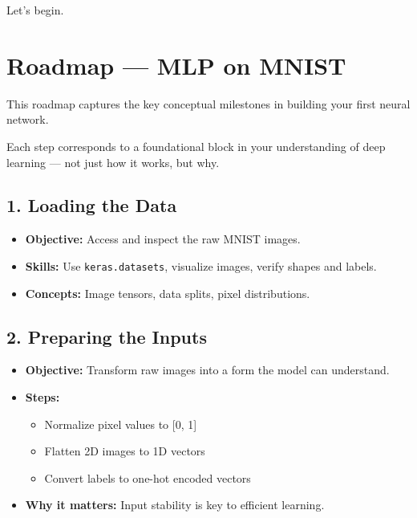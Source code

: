 \documentclass[11pt]{article}
\begin{document}
Let’s begin.

\section*{Roadmap — MLP on MNIST}

\begin{tcolorbox}[colback=blue!5!white, colframe=blue!40!black, title= The Journey Ahead]
This roadmap captures the key conceptual milestones in building your first neural network.

Each step corresponds to a foundational block in your understanding of deep learning — not just how it works, but why.
\end{tcolorbox}

\vspace{1em}

\subsection*{1. Loading the Data}

\begin{itemize}
    \item \textbf{Objective:} Access and inspect the raw MNIST images.
    \item \textbf{Skills:} Use \texttt{keras.datasets}, visualize images, verify shapes and labels.
    \item \textbf{Concepts:} Image tensors, data splits, pixel distributions.
\end{itemize}

\subsection*{2. Preparing the Inputs}

\begin{itemize}
    \item \textbf{Objective:} Transform raw images into a form the model can understand.
    \item \textbf{Steps:}
    \begin{itemize}
        \item Normalize pixel values to [0, 1]
        \item Flatten 2D images to 1D vectors
        \item Convert labels to one-hot encoded vectors
    \end{itemize}
    \item \textbf{Why it matters:} Input stability is key to efficient learning.
\end{itemize}
\end{document}
